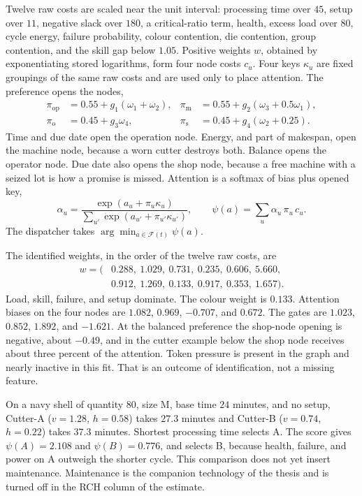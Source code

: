 \documentclass[10pt,a4paper]{article}
\begin{document}
Twelve raw costs are scaled near the unit interval: processing time over \(45\), setup over \(11\), negative slack over \(180\), a critical-ratio term, health, excess load over \(80\), cycle energy, failure probability, colour contention, die contention, group contention, and the skill gap below \(1.05\). Positive weights \(w\), obtained by exponentiating stored logarithms, form four node costs \(c_u\). Four keys \(\kappa_u\) are fixed groupings of the same raw costs and are used only to place attention. The preference opens the nodes,
\begin{align}
\pi_{\mathrm{op}} &= 0.55 + g_1(\omega_1+\omega_2), &
\pi_{\mathrm{m}} &= 0.55 + g_2(\omega_3+0.5\omega_1), \nonumber\\
\pi_{\mathrm{o}} &= 0.45 + g_3\omega_4, &
\pi_{\mathrm{s}} &= 0.45 + g_4(\omega_2+0.25).
\label{eq:open}
\end{align}
Time and due date open the operation node. Energy, and part of makespan, open the machine node, because a worn cutter destroys both. Balance opens the operator node. Due date also opens the shop node, because a free machine with a seized lot is how a promise is missed. Attention is a softmax of bias plus opened key,
\begin{equation}
\alpha_u = \frac{\exp(a_u + \pi_u \kappa_u)}{\sum_{u'} \exp(a_{u'} + \pi_{u'} \kappa_{u'})},
\qquad
\psi(a) = \sum_u \alpha_u \, \pi_u \, c_u .
\label{eq:psi}
\end{equation}
The dispatcher takes \(\arg\min_{a \in \mathcal{F}(t)} \psi(a)\).

The identified weights, in the order of the twelve raw costs, are
\begin{align*}
w = (&0.288,\ 1.029,\ 0.731,\ 0.235,\ 0.606,\ 5.660,\\
&0.912,\ 1.269,\ 0.133,\ 0.917,\ 0.353,\ 1.657).
\end{align*}
Load, skill, failure, and setup dominate. The colour weight is \(0.133\). Attention biases on the four nodes are \(1.082\), \(0.969\), \(-0.707\), and \(0.672\). The gates are \(1.023\), \(0.852\), \(1.892\), and \(-1.621\). At the balanced preference the shop-node opening is negative, about \(-0.49\), and in the cutter example below the shop node receives about three percent of the attention. Token pressure is present in the graph and nearly inactive in this fit. That is an outcome of identification, not a missing feature.

On a navy shell of quantity \(80\), size M, base time \(24\) minutes, and no setup, Cutter-A (\(v=1.28\), \(h=0.58\)) takes \(27.3\) minutes and Cutter-B (\(v=0.74\), \(h=0.22\)) takes \(37.3\) minutes. Shortest processing time selects A. The score gives \(\psi(A) = 2.108\) and \(\psi(B) = 0.776\), and selects B, because health, failure, and power on A outweigh the shorter cycle. This comparison does not yet insert maintenance. Maintenance is the companion technology of the thesis and is turned off in the RCH column of the estimate.
\end{document}
